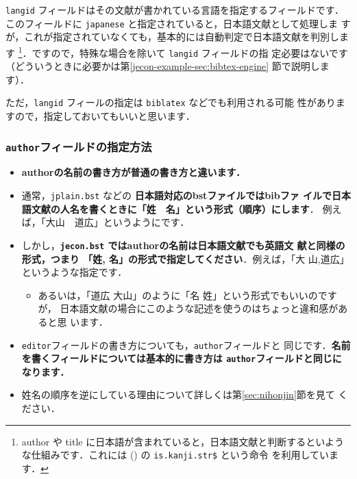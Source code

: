 \documentclass[article]{jlreq}
\begin{document}
\texttt{langid} フィールドはその文献が書かれている言語を指定するフィールドです．
このフィールドに \texttt{japanese} と指定されていると，日本語文献として処理しま
すが，これが指定されていなくても，基本的には自動判定で日本語文献を判別します
\footnote{author や title に日本語が含まれていると，日本語文献と判断するといよう
な仕組みです．これには \pBibTeX (\upBibTeX) の \texttt{is.kanji.str\$} という命令
を利用しています．}．ですので，特殊な場合を除いて \texttt{langid} フィールドの指
定必要はないです（どういうときに必要かは第\ref{jecon-example-sec:bibtex-engine}
節で説明します）．

ただ，\texttt{langid} フィールの指定は \texttt{biblatex} などでも利用される可能
性がありますので，指定しておいてもいいと思います．



\subsubsection{\texttt{author}フィールドの指定方法}
\label{jecon-example-sec:author}

\begin{itemize}
 \item \textbf{authorの名前の書き方が普通の書き方と違います．}
 \item 通常，\texttt{jplain.bst} などの \textbf{日本語対応のbstファイルではbibファ
       イルで日本語文献の人名を書くときに「姓　名」という形式（順序）にします}．
       例えば，「大山　道広」というようにです．
 \item しかし，\textbf{\texttt{jecon.bst} ではauthorの名前は日本語文献でも英語文
       献と同様の形式，つまり 「姓, 名」の形式で指定してください}．例えば，「大
       山,道広」というような指定です．
       \begin{itemize}
        \item あるいは，「道広 大山」のように「名 姓」という形式でもいいのですが，
              日本語文献の場合にこのような記述を使うのはちょっと違和感があると思
              います．
       \end{itemize}
 \item \texttt{editor}フィールドの書き方についても，\texttt{author}フィールドと
       同じです．\textbf{名前を書くフィールドについては基本的に書き方は
       \texttt{author}フィールドと同じになります．}
 \item 姓名の順序を逆にしている理由について詳しくは第\ref{sec:nihonjin}節を見て
       ください．
\end{itemize}
\end{document}
